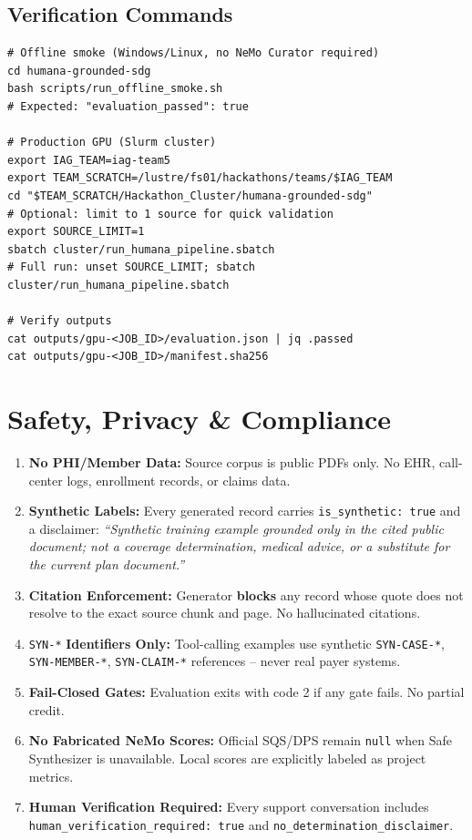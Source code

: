 \documentclass[11pt,a4paper]{article}
\begin{document}
\subsection{Verification Commands}
\begin{lstlisting}[style=nvidia, caption={Reproduction Commands}]
# Offline smoke (Windows/Linux, no NeMo Curator required)
cd humana-grounded-sdg
bash scripts/run_offline_smoke.sh
# Expected: "evaluation_passed": true

# Production GPU (Slurm cluster)
export IAG_TEAM=iag-team5
export TEAM_SCRATCH=/lustre/fs01/hackathons/teams/$IAG_TEAM
cd "$TEAM_SCRATCH/Hackathon_Cluster/humana-grounded-sdg"
# Optional: limit to 1 source for quick validation
export SOURCE_LIMIT=1
sbatch cluster/run_humana_pipeline.sbatch
# Full run: unset SOURCE_LIMIT; sbatch cluster/run_humana_pipeline.sbatch

# Verify outputs
cat outputs/gpu-<JOB_ID>/evaluation.json | jq .passed
cat outputs/gpu-<JOB_ID>/manifest.sha256
\end{lstlisting}

\section{Safety, Privacy \& Compliance}
\label{sec:safety}

\begin{nvidiabox}
\begin{enumerate}[label=\textcolor{nvidiaGreen}{\textbf{\arabic.}}, leftmargin=*]
    \item \textbf{No PHI/Member Data:} Source corpus is public PDFs only. No EHR, call-center logs, enrollment records, or claims data.
    \item \textbf{Synthetic Labels:} Every generated record carries \texttt{is\_synthetic: true} and a disclaimer: \textit{``Synthetic training example grounded only in the cited public document; not a coverage determination, medical advice, or a substitute for the current plan document.''}
    \item \textbf{Citation Enforcement:} Generator \textbf{blocks} any record whose quote does not resolve to the exact source chunk and page. No hallucinated citations.
    \item \texttt{SYN-*} \textbf{Identifiers Only:} Tool-calling examples use synthetic \texttt{SYN-CASE-*}, \texttt{SYN-MEMBER-*}, \texttt{SYN-CLAIM-*} references -- never real payer systems.
    \item \textbf{Fail-Closed Gates:} Evaluation exits with code 2 if any gate fails. No partial credit.
    \item \textbf{No Fabricated NeMo Scores:} Official SQS/DPS remain \texttt{null} when Safe Synthesizer is unavailable. Local scores are explicitly labeled as project metrics.
    \item \textbf{Human Verification Required:} Every support conversation includes \texttt{human\_verification\_required: true} and \texttt{no\_determination\_disclaimer}.
\end{enumerate}
\end{nvidiabox}
\end{document}
